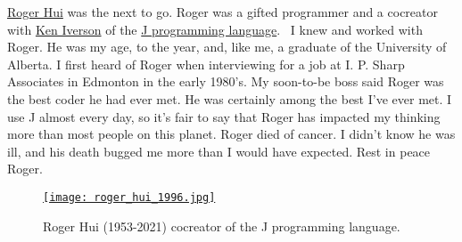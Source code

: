 
\href{https://rogerhui.rip/}{Roger Hui} was the next to go. Roger was a
gifted programmer and a cocreator with
\href{https://en.wikipedia.org/wiki/Kenneth_E._Iverson}{Ken Iverson} of
the \href{https://www.jsoftware.com/\#/}{J programming language}.~ I
knew and worked with Roger. He was my age, to the year, and, like me, a
graduate of the University of Alberta. I first heard of Roger when
interviewing for a job at I. P. Sharp Associates in Edmonton in the
early 1980's. My soon-to-be boss said Roger was the best coder he had
ever met. He was certainly among the best I've ever met. I use J almost
every day, so it's fair to say that Roger has impacted my thinking more
than most people on this planet. Roger died of cancer. I didn't know he
was ill, and his death bugged me more than I would have expected. Rest
in peace Roger.


\begin{SCfigure}[2]
\centering
\href{https://bakerjd99.files.wordpress.com/2022/01/roger_hui_1996.jpg}{\texttt{[image: roger\_hui\_1996.jpg]}}
\caption{Roger Hui (1953-2021) cocreator of the J programming language.}
\label{fig:7274x1}
\end{SCfigure}


